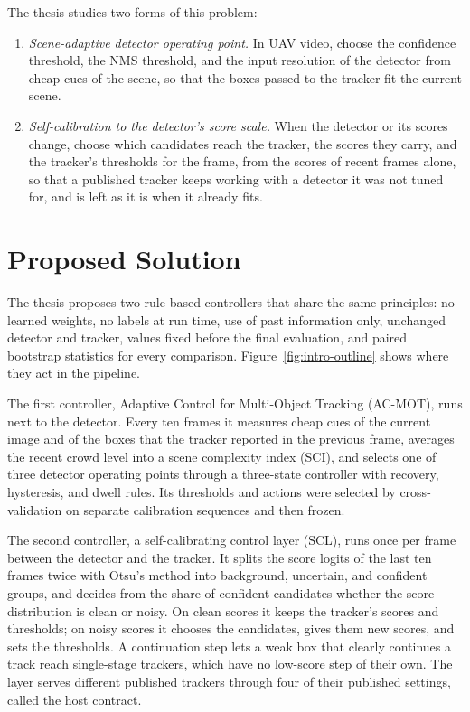 The thesis studies two forms of this problem:
\begin{enumerate}
\item \emph{Scene-adaptive detector operating point.} In UAV video, choose the confidence threshold, the NMS threshold, and the input resolution of the detector from cheap cues of the scene, so that the boxes passed to the tracker fit the current scene.
\item \emph{Self-calibration to the detector's score scale.} When the detector or its scores change, choose which candidates reach the tracker, the scores they carry, and the tracker's thresholds for the frame, from the scores of recent frames alone, so that a published tracker keeps working with a detector it was not tuned for, and is left as it is when it already fits.
\end{enumerate}

\section{Proposed Solution}\label{sec:intro-solution}
The thesis proposes two rule-based controllers that share the same principles: no learned weights, no labels at run time, use of past information only, unchanged detector and tracker, values fixed before the final evaluation, and paired bootstrap statistics for every comparison. Figure~\ref{fig:intro-outline} shows where they act in the pipeline.

The first controller, Adaptive Control for Multi-Object Tracking (AC-MOT), runs next to the detector. Every ten frames it measures cheap cues of the current image and of the boxes that the tracker reported in the previous frame, averages the recent crowd level into a scene complexity index (SCI), and selects one of three detector operating points through a three-state controller with recovery, hysteresis, and dwell rules. Its thresholds and actions were selected by cross-validation on separate calibration sequences and then frozen.

The second controller, a self-calibrating control layer (SCL), runs once per frame between the detector and the tracker. It splits the score logits of the last ten frames twice with Otsu's method \cite{goh2018otsu} into background, uncertain, and confident groups, and decides from the share of confident candidates whether the score distribution is clean or noisy. On clean scores it keeps the tracker's scores and thresholds; on noisy scores it chooses the candidates, gives them new scores, and sets the thresholds. A continuation step lets a weak box that clearly continues a track reach single-stage trackers, which have no low-score step of their own. The layer serves different published trackers through four of their published settings, called the host contract.

